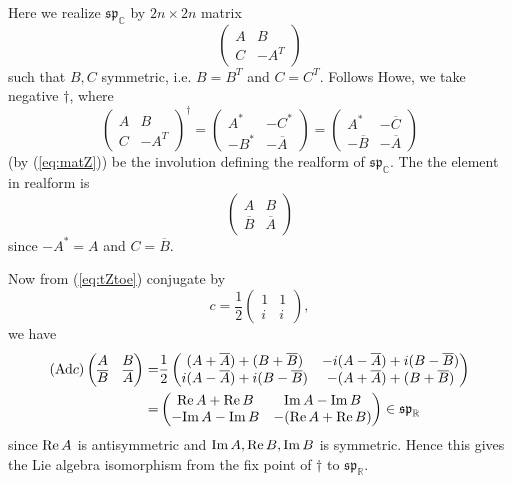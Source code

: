 \documentclass[12pt]{amsart}
\def\bR{{\mathbb{R}}}
\def\bC{{\mathbb{C}}}
\def\sp{{\mathfrak{sp}}}
\def\Ad{{\rm Ad}}
\def\Ad{\mathrm{Ad}}
\def\real{{\rm Re\,}}
\def\imag{{\rm Im\,}}
\begin{document}
Here we realize $\sp_\bC$ by $2n\times 2n$ matrix
\[
\begin{pmatrix}
A & B \\
C & -A^T
\end{pmatrix}
\]
such that $B,C$ symmetric, i.e. $B=B^T$ and $C= C^T$.
Follows Howe\cite{Howe1985}, we take negative $\dagger$, where 
\[
\begin{pmatrix}
A & B\\
C & -A^T 
\end{pmatrix}^\dagger
=
\begin{pmatrix}
A^* & -C^*\\
-B^* & -\overline{A}
\end{pmatrix}
=\begin{pmatrix}
A^* & -\overline{C}\\
-\overline{B} & -\overline{A}
\end{pmatrix}
\]
(by (\ref{eq:matZ})) be the involution defining the realform of $\sp_\bC$.
The the element in realform is 
\[
\begin{pmatrix}
A & B\\
\overline{B} & \overline{A}
\end{pmatrix}
\]
since $ -A^* = A$ and $C=\overline{B}$.

Now from (\ref{eq:tZtoe})  conjugate by 
\[c = \frac{1}{2}
\begin{pmatrix}
1 & 1\\
i & i
\end{pmatrix},
\]
we have 
\[
\begin{split}
(\Ad c)
\begin{pmatrix}
A & B\\
\overline{B} & \overline{A}
\end{pmatrix}
=& \frac{1}{2}
\begin{pmatrix}
(A + \overline{A}) + (B +\overline{B}) &-i(A-\overline{A}) +i(B-\overline{B})\\
i(A-\overline{A}) + i(B-\overline{B})& -(A + \overline{A}) + (B +\overline{B})
\end{pmatrix}\\
=&\begin{pmatrix}
\real A  + \real B & \imag A - \imag B\\
-\imag A -\imag B & -(\real A+\real B)  
\end{pmatrix}
\in \sp_\bR
\end{split}
\]
since $\real A$ is antisymmetric and $\imag A, \real B, \imag B$ is symmetric. 
Hence this gives the Lie algebra isomorphism from the fix point of $\dagger$ 
to $\sp_\bR$. 
\end{document}
